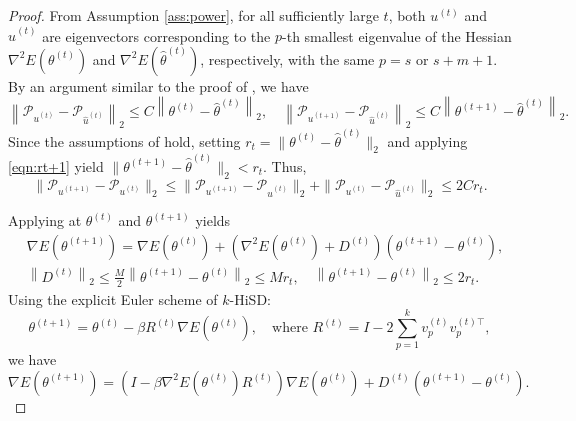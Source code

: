 \documentclass[final]{siamart251216}
\begin{document}
\begin{proof}
From Assumption \ref{ass:power}, for all sufficiently large $t$, both $u^{(t)}$ and $\hat{u}^{(t)}$ are eigenvectors corresponding to the $p$-th smallest eigenvalue of the Hessian $\nabla^2 E(\theta^{(t)})$ and $\nabla^2 E(\hat{\theta}^{(t)})$, respectively, with the same $p=s$ or $s+m+1$. 
By an argument similar to the proof of , we have
\begin{equation*}
\left\|\mathcal{P}_{u^{(t)}}-\mathcal{P}_{\hat{u}^{(t)}}\right\|_{2}
\leqslant 
C\left\|\theta^{(t)}-\hat{\theta}^{(t)}\right\|_{2},
\quad
\left\|\mathcal{P}_{u^{(t+1)}}-\mathcal{P}_{\hat{u}^{(t)}}\right\|_{2}
\leqslant 
C\left\|\theta^{(t+1)}-\hat{\theta}^{(t)}\right\|_{2}.
\end{equation*}
Since the assumptions of  hold, setting $r_t = \|\theta^{(t)} - \hat{\theta}^{(t)}\|_2$ and applying \eqref{eqn:rt+1} yield $\|\theta^{(t+1)} - \hat{\theta}^{(t)}\|_2 < r_t$. Thus,
\begin{equation}\label{eqn:pupu}
\|\mathcal{P}_{u^{(t+1)}}-\mathcal{P}_{u^{(t)}}\|_{2}
\leqslant
\|\mathcal{P}_{u^{(t+1)}}-\mathcal{P}_{\hat{u}^{(t)}}\|_{2}+
\|\mathcal{P}_{u^{(t)}}-\mathcal{P}_{\hat{u}^{(t)}}\|_{2}
\leqslant 2C r_t.
\end{equation}

Applying  at $\theta^{(t)}$ and $\theta^{(t+1)}$ yields
\begin{equation}\label{eqn:t+1} 
\begin{aligned}
&\nabla E(\theta^{(t+1)})
= \nabla E(\theta^{(t)})  + 
\left(\nabla^2E(\theta^{(t)})+ D^{(t)}\right)
\left(\theta^{(t+1)}-\theta^{(t)}\right),
\\
& \left\|D^{(t)}\right\|_2\leqslant 
\frac M2 \left\|\theta^{(t+1)}-\theta^{(t)}\right\|_2
\leqslant M r_t,
\quad 
\left\|\theta^{(t+1)}-\theta^{(t)}\right\|_2
\leqslant 2 r_t.
\end{aligned}
\end{equation}
Using the explicit Euler scheme of $k$-HiSD:
\begin{equation}
\theta^{(t+1)}=
\theta^{(t)}
-\beta R^{(t)}\nabla E(\theta^{(t)}), \quad
\text{where } 
R^{(t)}=I-2\sum_{p=1}^k v_p^{(t)}v_p^{(t)\top},
\end{equation}
we have 
\begin{equation} \label{eqn:power}
\nabla E(\theta^{(t+1)})
= \left(I -
\beta \nabla^2E(\theta^{(t)}) R^{(t)} \right)
\nabla E(\theta^{(t)}) + 
D^{(t)}
\left(\theta^{(t+1)}-\theta^{(t)}\right).
\end{equation}


\end{proof}
\end{document}
